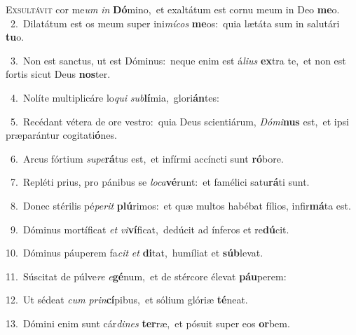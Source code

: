 \lettrine{\initial\textcolor{\initialcolor}{E}}{xsultávit} cor me\textit{um} \textit{in} \textbf{Dó}\-mino,~\star et exaltátum est cornu meum in Deo \textbf{me}\-o.\\
{\numbfont\textcolor{\numbcolor}{~2.}}~Dilatátum est os meum super ini\-\textit{mí}\-\textit{cos} \textbf{me}\-os:~\star quia lætáta sum in salutári \textbf{tu}\-o.\par
{\numbfont\textcolor{\numbcolor}{~3.}}~Non est sanctus, ut est Dóminus:~\dagger neque enim est á\-\textit{li}\-\textit{us} \textbf{ex}\-tra te,~\star et non est fortis sicut Deus \textbf{nos}\-ter.\par
{\numbfont\textcolor{\numbcolor}{~4.}}~Nolíte multiplicáre lo\textit{qui} \textit{sub}\-\textbf{lí}mia,~\star glori\-\textbf{án}\-tes:\par
{\numbfont\textcolor{\numbcolor}{~5.}}~Recédant vétera de ore vestro:~\dagger quia Deus scientiárum, \textit{Dó}\-\textit{mi}\textbf{nus} est,~\star et ipsi præparántur cogitati\-\textbf{ó}\-nes.\par
{\numbfont\textcolor{\numbcolor}{~6.}}~Arcus fórtium \textit{su}\-\textit{pe}\textbf{rá}tus est,~\star et infírmi accíncti sunt \textbf{ró}\-bore.\par
{\numbfont\textcolor{\numbcolor}{~7.}}~Repléti prius, pro pánibus se \textit{lo}\-\textit{ca}\textbf{vé}runt:~\star et famélici satu\-\textbf{rá}\-ti sunt.\par
{\numbfont\textcolor{\numbcolor}{~8.}}~Donec stérilis pé\-\textit{pe}\-\textit{rit} \textbf{plú}\-rimos:~\star et quæ multos habébat fílios, infir\-\textbf{má}\-ta est.\par
{\numbfont\textcolor{\numbcolor}{~9.}}~Dóminus mortíficat \textit{et} \textit{vi}\-\textbf{ví}ficat,~\star dedúcit ad ínferos et re\-\textbf{dú}\-cit.\par
{\numbfont\textcolor{\numbcolor}{10.}}~Dóminus páuperem fa\textit{cit} \textit{et} \textbf{di}\-tat,~\star humíliat et \textbf{súb}\-levat.\par
{\numbfont\textcolor{\numbcolor}{11.}}~Súscitat de púlve\textit{re} \textit{e}\-\textbf{gé}num,~\star et de stércore élevat \textbf{páu}\-perem:\par
{\numbfont\textcolor{\numbcolor}{12.}}~Ut sédeat \textit{cum} \textit{prin}\-\textbf{cí}pibus,~\star et sólium glóriæ \textbf{té}\-neat.\par
{\numbfont\textcolor{\numbcolor}{13.}}~Dómini enim sunt cár\-\textit{di}\-\textit{nes} \textbf{ter}\-ræ,~\star et pósuit super eos \textbf{or}\-bem.\par
